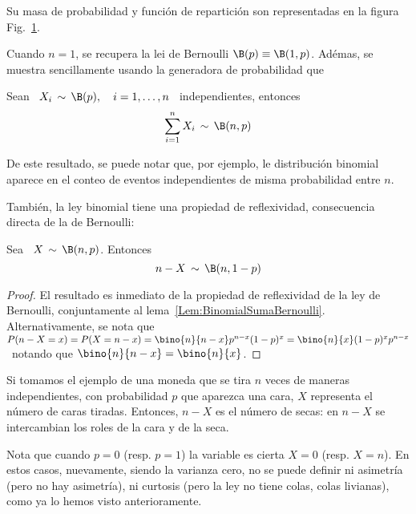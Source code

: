 Su masa  de probabilidad  y funci\'on de  repartici\'on son representadas  en la
figura Fig.~\ref{Fig:MP:Binomial}.
%
\begin{figure}[h!]
\begin{center}  \end{center}
%
\label{Fig:MP:Binomial}
\end{figure}


Cuando  $n  = 1$,  se  recupera  la lei  de  Bernoulli  $\B(p) \equiv  \B(1,p)$.
Ad\'emas, se muestra  sencillamente usando la generadora de  probabilidad que
%
\begin{lema}
\label{Lem:BinomialSumaBernoulli}
%
  Sean \  $X_i \,  \sim \, \B(p),  \quad i  = 1, \ldots  , n$  \ independientes,
  entonces
  \[
  \sum_{i=1}^n X_i \, \sim \, \B(n,p)
  \]
\end{lema}
%
De este resultado,  se puede notar que, por  ejemplo, le distribuci\'on binomial
aparece en el conteo de eventos independientes de misma probabilidad entre $n$.

Tambi\'en,  la ley binomial  tiene una  propiedad de  reflexividad, consecuencia
directa de la de Bernoulli:
%
\begin{lema}[Reflexividad]
\label{Lem:MP:ReflexividadBinomial}
%
  Sea \ $X \, \sim \, \B(n,p)$. Entonces
  \[
  n-X \, \sim \, \B(n,1-p)
  \]
\end{lema}
%
\begin{proof}
  El  resultado es  inmediato  de la  propiedad  de reflexividad  de  la ley  de
  Bernoulli,                           conjuntamente                          al
  lema~\ref{Lem:BinomialSumaBernoulli}. Alternativamente,  se nota que  $P(n-X =
  x) = P(X = n-x) = \bino{n}{n-x} p^{n-x} (1-p)^x = \bino{n}{x} (1-p)^x p^{n-x}$
  \ notando que $\bino{n}{n-x} = \bino{n}{x}$.
\end{proof}
%
Si  tomamos  el  ejemplo  de  una  moneda  que se  tira  $n$  veces  de  maneras
independientes, con  probabilidad $p$ que  aparezca una cara, $X$  representa el
n\'umero de caras tiradas. Entonces, $n-X$  es el n\'umero de secas: en $n-X$ se
intercambian los roles de la cara y de la seca.

Nota que cuando $p = 0$ (resp. $p = 1$) la variable es cierta $X = 0$ (resp.  $X
= n$).  En estos casos, nuevamente,  siendo la varianza cero, no se puede definir
ni asimetr\'ia  (pero no  hay asimetr\'ia),  ni curtosis (pero  la ley  no tiene
colas, \ie colas livianas), como ya lo hemos visto anterioramente.

